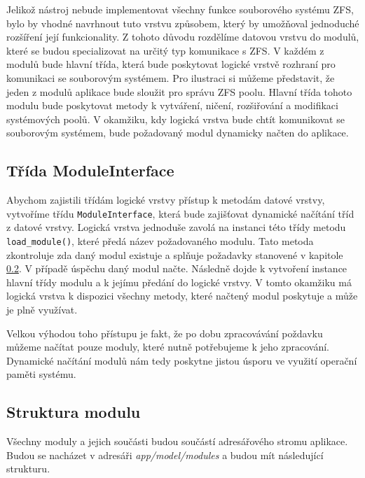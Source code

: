 Jelikož nástroj nebude implementovat všechny funkce souborového systému ZFS, bylo by vhodné navrhnout tuto vrstvu způsobem, který by umožňoval jednoduché rozšíření její funkcionality.
Z tohoto důvodu rozdělíme datovou vrstvu do modulů, které se budou specializovat na určitý typ komunikace s ZFS. V každém z modulů bude hlavní třída, která bude poskytovat logické vrstvě rozhraní pro komunikaci se souborovým systémem. Pro ilustraci si můžeme představit, že jeden z modulů aplikace bude sloužit pro správu ZFS poolu. Hlavní třída tohoto modulu bude poskytovat metody k vytváření, ničení, rozšiřování a modifikaci systémových poolů. V okamžiku, kdy logická vrstva bude chtít komunikovat se souborovým systémem, bude požadovaný modul dynamicky načten do aplikace.
    \subsection{Třída ModuleInterface}
    Abychom zajistili třídám logické vrstvy přístup k metodám datové vrstvy, vytvoříme třídu \verb|ModuleInterface|, která bude zajišťovat dynamické načítání tříd z datové vrstvy. Logická vrstva jednoduše zavolá na instanci této třídy metodu \verb|load_module()|, které předá název požadovaného modulu. Tato metoda zkontroluje zda daný modul existuje a splňuje požadavky stanovené v kapitole \ref{package}. V případě úspěchu daný modul načte. Následně dojde k vytvoření instance hlavní třídy modulu a k jejímu předání do logické vrstvy. V tomto okamžiku má logická vrstva k dispozici všechny metody, které načtený modul poskytuje a může je plně využívat.

    Velkou výhodou toho přístupu je fakt, že po dobu zpracovávání poždavku můžeme načítat pouze moduly, které nutně potřebujeme k jeho zpracování. Dynamické načítání modulů nám tedy poskytne jistou úsporu ve využití operační paměti systému.
    \subsection{Struktura modulu}
    \label{package}
    Všechny moduly a jejich součásti budou součástí adresářového stromu aplikace. Budou se nacházet v adresáři \emph{app/model/modules} a budou mít následující strukturu.
    \begin{figure}
      \centering
    \end{figure}

